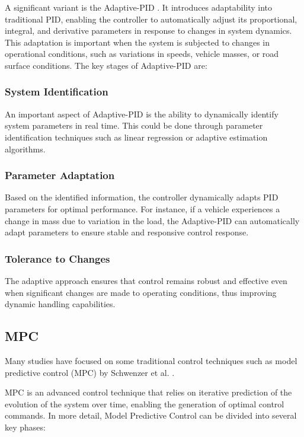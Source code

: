 \documentclass[conference]{IEEEtran}
\begin{document}
A significant variant is the Adaptive-PID \cite{ADAPTIVE_PID}.
%
It introduces adaptability into traditional PID, enabling the controller to automatically adjust its proportional, integral, and derivative parameters in response to changes in system dynamics.
%
This adaptation is important when the system is subjected to changes in operational conditions, such as variations in speeds, vehicle masses, or road surface conditions.
%
The key stages of Adaptive-PID are:

\subsubsection{System Identification}
An important aspect of Adaptive-PID is the ability to dynamically identify system parameters in real time.
%
This could be done through parameter identification techniques such as linear regression or adaptive estimation algorithms.

\subsubsection{Parameter Adaptation}
Based on the identified information, the controller dynamically adapts PID parameters for optimal performance.
%
For instance, if a vehicle experiences a change in mass due to variation in the load, the Adaptive-PID can automatically adapt parameters to ensure stable and responsive control response.

\subsubsection{Tolerance to Changes}
The adaptive approach ensures that control remains robust and effective even when significant changes are made to operating conditions, thus improving dynamic handling capabilities.

%
%
%
\subsection{MPC}

Many studies have focused on some traditional control techniques such as model predictive control (MPC) by Schwenzer et al. \cite{MPC}.  

MPC is an advanced control technique that relies on iterative prediction of the evolution of the system over time, enabling the generation of optimal control commands.
%
In more detail, Model Predictive Control can be divided into several key phases:
\end{document}
